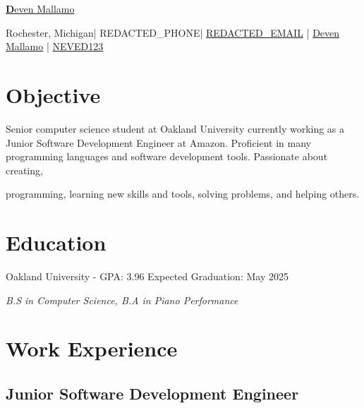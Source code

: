\documentclass{article}
\newcommand{\resumesection}[1]{
	\section*{\Large\textbf{#1}}
	\hrulefill
	\vspace{1ex}
}
\newcommand{\name}{Deven Mallamo}
\newcommand{\address}{Rochester, Michigan}
\newcommand{\phone}{REDACTED_PHONE}
\newcommand{\email}{REDACTED_EMAIL}
\newcommand{\linkedin}{Deven Mallamo}
\newcommand{\github}{NEVED123}
\begin{document}
\begin{tcolorbox}[colback= boxfill,colframe=boxframe]
	\begin{center}
		\vspace{5pt}
		\href{https://www.devenmallamo.com}{\Huge \textbf \name} 

		\normalsize \vspace{10pt}

		\faHome \space \address \space | 
		\faPhone \space \phone \space |
		\href{mailto:\email}{\faEnvelope \space \email} \space | 
		\href{https://www.linkedin.com/in/deven-mallamo/}{\faLinkedin \space \linkedin} \space | 
		\href{https://github.com/NEVED123}{\faGithub \space \github} 
	\end{center}
\end{tcolorbox}

\vspace{1ex}

\resumesection{Objective}

\vspace{.2ex}	

Senior computer science student at Oakland University currently working as a Junior Software Development Engineer at Amazon. Proficient in many programming languages and software development tools. Passionate about creating, 

programming, learning new skills and tools, solving problems, and helping others.

\vspace{.5ex}	


\resumesection{Education}

\vspace{.2ex}	

Oakland University - GPA: 3.96 \hfill Expected Graduation: May 2025

\textit {B.S in Computer Science, B.\hspace{49152sp}A in Piano Performance} 

\vspace{.5ex}


\resumesection{Work Experience}

\subsection*{Junior Software Development Engineer} 
\end{document}
